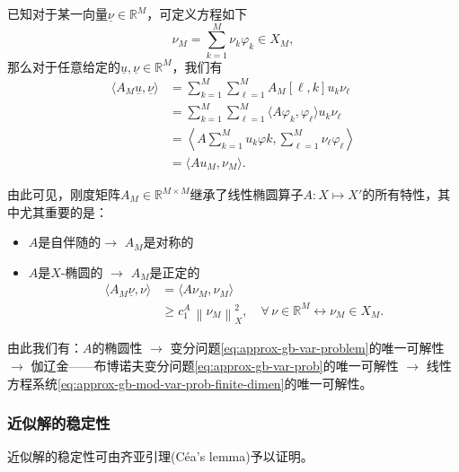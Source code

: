 已知对于某一向量$\underline{\nu} \in \mathbb{R}^{M}$，可定义方程如下
\begin{equation*}
  \nu_{M} = \sum_{k=1}^{M} \nu_{k} \varphi_{k} \in X_{M},
\end{equation*}
那么对于任意给定的$\underline{u}, \underline{\nu} \in \mathbb{R}^{M}$，我们有
\begin{equation*}
  \begin{split}
    \langle A_{M} \underline{u}, \underline{\nu} \rangle
    & = \sum_{k=1}^{M} \sum_{\ell = 1}^{M} A_{M} \left[ \ell, k \right] u_{k} \nu_{\ell}\\
    & = \sum_{k=1}^{M} \sum_{\ell = 1}^{M}
    \langle
    A \varphi_{k}, \varphi_{\ell}
    \rangle
    u_{k} \nu_{\ell}\\
    & = \left\langle
    A \sum_{k=1}^{M} u_{k} \varphi{k},
    \sum_{\ell = 1}^{M} \nu_{\ell} \varphi_{\ell}
    \right\rangle \\
    & = \langle A u_{M}, \nu_{M} \rangle.
  \end{split}
\end{equation*}

由此可见，刚度矩阵$A_{M} \in \mathbb{R}^{M \times M}$继承了线性椭圆算子$A: X \mapsto X'$的所有特性，其中尤其重要的是：
\begin{itemize}
  \item $A$是自伴随的$\rightarrow$ $A_{M}$是对称的
  \item $A$是$X$-椭圆的 $\rightarrow$ $A_{M}$是正定的
  \begin{equation*}
    \begin{split}
      \langle A_{M} \underline{\nu}, \nu \rangle
      & = \langle A \nu_{M}, \nu_{M} \rangle \\
      & \ge c_{1}^{A} \, \left\| \nu_{M} \right\|_{X}^{2},
      \quad \forall \, \nu \in \mathbb{R}^{M} \leftrightarrow \nu_{M} \in X_{M}.
    \end{split}
  \end{equation*}
\end{itemize}

由此我们有：$A$的椭圆性 $\rightarrow$ 变分问题\eqref{eq:approx-gb-var-problem}的唯一可解性 $\rightarrow$ 伽辽金——布博诺夫变分问题\eqref{eq:approx-gb-var-prob}的唯一可解性 $\rightarrow$ 线性方程系统\eqref{eq:approx-gb-mod-var-prob-finite-dimen}的唯一可解性。

\subsubsection{近似解的稳定性}
\label{sec:approx-gb-solution-stability}
近似解的稳定性可由齐亚引理(Céa's lemma)予以证明。

